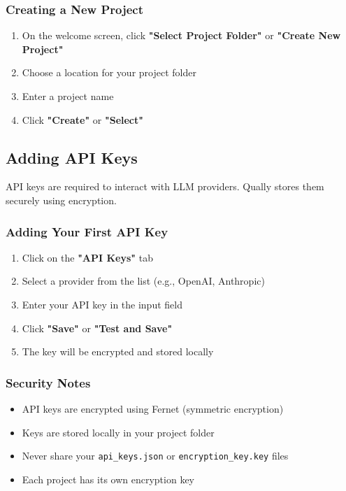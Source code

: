 \documentclass[11pt,a4paper]{article}
\begin{document}
\subsubsection{Creating a New Project}
\begin{enumerate}
    \item On the welcome screen, click \textbf{"Select Project Folder"} or \textbf{"Create New Project"}
    \item Choose a location for your project folder
    \item Enter a project name
    \item Click \textbf{"Create"} or \textbf{"Select"}
\end{enumerate}

\subsection{Adding API Keys}
API keys are required to interact with LLM providers. Qually stores them securely using encryption.

\subsubsection{Adding Your First API Key}
\begin{enumerate}
    \item Click on the \textbf{"API Keys"} tab
    \item Select a provider from the list (e.g., OpenAI, Anthropic)
    \item Enter your API key in the input field
    \item Click \textbf{"Save"} or \textbf{"Test and Save"}
    \item The key will be encrypted and stored locally
\end{enumerate}

\subsubsection{Security Notes}
\begin{itemize}
    \item API keys are encrypted using Fernet (symmetric encryption)
    \item Keys are stored locally in your project folder
    \item Never share your \texttt{api\_keys.json} or \texttt{encryption\_key.key} files
    \item Each project has its own encryption key
\end{itemize}
\end{document}
